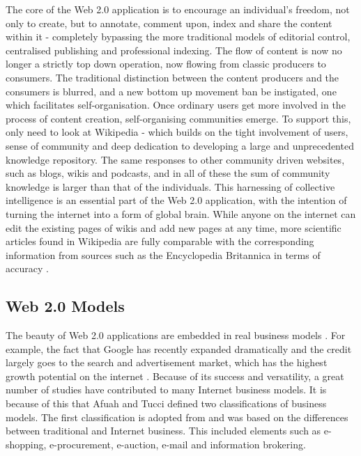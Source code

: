 The core of the Web 2.0 application is to encourage an individual's freedom, not only to create, but to annotate, comment upon, index and share the content within it - completely bypassing the more traditional models of editorial control, centralised publishing and professional indexing. The flow of content is now no longer a strictly top down operation, now flowing from classic producers to consumers. The traditional distinction between the content producers and the consumers is blurred, and a new bottom up movement ban be instigated, one which facilitates self-organisation. Once ordinary users get more involved in the process of content creation, self-organising communities emerge. To support this, only need to look at Wikipedia - which builds on the tight involvement of users, sense of community and deep dedication to developing a large and unprecedented knowledge repository. The same responses to other community driven websites, such as blogs, wikis and podcasts, and in all of these the sum of community knowledge is larger than that of the individuals. This harnessing of collective intelligence is an essential part of the Web 2.0 application, with the intention of turning the internet into a form of global brain. While anyone on the internet can edit the existing pages of wikis and add new pages at any time, more scientific articles found in Wikipedia are fully comparable with the corresponding information from sources such as the Encyclopedia Britannica in terms of accuracy \cite{berthon2012marketing}.

\subsection{Web 2.0 Models}

The beauty of Web 2.0 applications are embedded in real business models \cite{webtim}. For example, the fact that Google has recently expanded dramatically and the credit largely goes to the search and advertisement market, which has the highest growth potential on the internet \cite{21}. Because of its success and versatility, a great number of studies have contributed to many Internet business models. It is because of this that Afuah and Tucci \cite{22} defined two classifications of business models. The first classification is adopted from \cite{23} and was based on the differences between traditional and Internet business. This included elements such as e-shopping, e-procurement, e-auction, e-mail and information brokering. 

